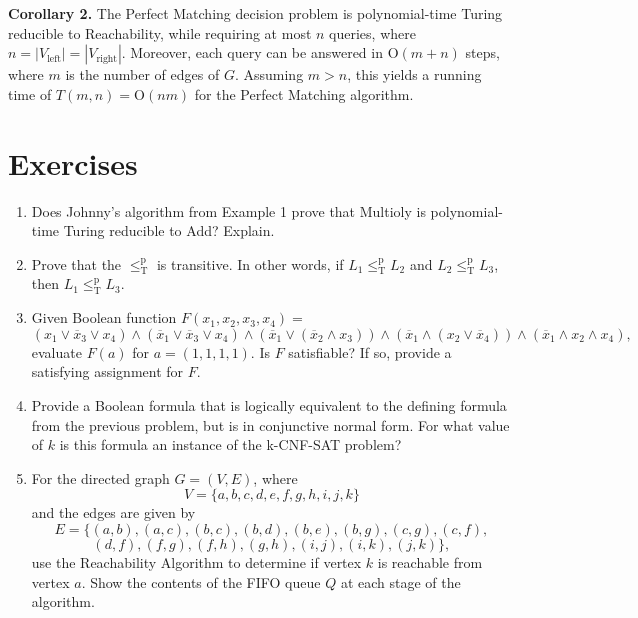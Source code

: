 \documentclass [12pt]{article}
\theoremstyle{definition}
\begin{document}
{\bf Corollary 2.} The Perfect Matching decision problem is polynomial-time Turing reducible to Reachability, while requiring at most $n$ queries, where $n=|V_{\mbox{left}}|=|V_{\mbox{right}}|$.
Moreover, each query can be answered in $\mbox{O}(m+n)$ steps, where $m$ is the number of edges of $G$. Assuming $m > n$, this yields a running time of $T(m,n)=\mbox{O}(nm)$ for the 
Perfect Matching algorithm. 








\newpage
\section*{Exercises}

\begin{enumerate}

\item Does Johnny's algorithm from Example 1 prove that Multioly is polynomial-time Turing reducible to Add? Explain.

\item Prove that the $\leq_{\mbox{T}}^{\mbox{p}}$ is transitive. In other words, if $L_{1}\leq_{\mbox{T}}^{\mbox{p}}L_{2}$ and
$L_{2}\leq_{\mbox{T}}^{\mbox{p}}L_{3}$, then $L_{1}\leq_{\mbox{T}}^{\mbox{p}}L_{3}$.


\item Given Boolean function $F(x_{1},x_{2},x_{3},x_{4})=$
\[
(x_{1}\vee \overline{x}_{3}\vee x_{4})\wedge
(\overline{x}_{1}\vee \overline{x}_{3}\vee x_{4})\wedge
(\overline{x}_{1}\vee(\overline{x}_{2}\wedge x_{3}))\wedge
(\overline{x}_{1}\wedge(x_{2}\vee\overline{x}_{4}))\wedge
(\overline{x}_{1}\wedge x_{2}\wedge x_{4}),
\]
evaluate $F(a)$ for $a=(1,1,1,1)$. Is $F$ satisfiable? If so, provide
a satisfying assignment for $F$.

\item Provide a Boolean formula that is logically equivalent to the defining formula
from the previous problem, but is in conjunctive normal form. For what value of $k$ is this
 formula an instance of the
k-CNF-SAT problem?

\item For the directed graph
$G=(V,E)$, where \[V=\{a,b,c,d,e,f,g,h,i,j,k\}\] and the edges are given by
\[E=\{(a,b),(a,c),(b,c),(b,d),(b,e),(b,g),(c,g),(c,f),\] 
\[(d,f),(f,g),(f,h),(g,h),(i,j),(i,k),(j,k)\},\]
use the Reachability Algorithm to determine if vertex $k$ is reachable from vertex $a$.
Show the contents of the FIFO queue $Q$ at each stage of the algorithm.


\end{enumerate}
\end{document}
